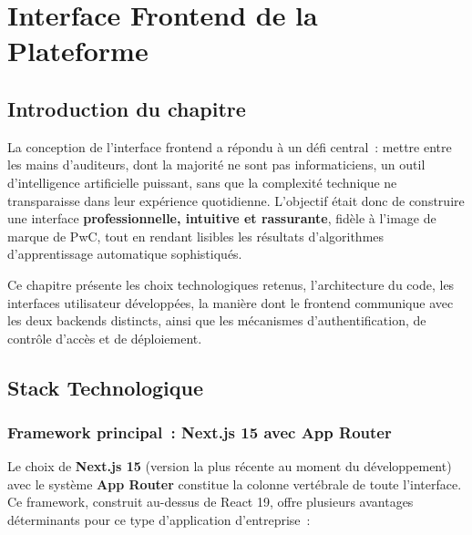 
\chapter{Interface Frontend de la Plateforme}

\section*{Introduction du chapitre}

La conception de l'interface frontend a répondu à un défi central~: mettre entre les mains d'auditeurs, dont la majorité ne sont pas informaticiens, un outil d'intelligence artificielle puissant, sans que la complexité technique ne transparaisse dans leur expérience quotidienne. L'objectif était donc de construire une interface \textbf{professionnelle, intuitive et rassurante}, fidèle à l'image de marque de PwC, tout en rendant lisibles les résultats d'algorithmes d'apprentissage automatique sophistiqués.

Ce chapitre présente les choix technologiques retenus, l'architecture du code, les interfaces utilisateur développées, la manière dont le frontend communique avec les deux backends distincts, ainsi que les mécanismes d'authentification, de contrôle d'accès et de déploiement.

\section{Stack Technologique}

\subsection{Framework principal~: Next.js 15 avec App Router}

Le choix de \textbf{Next.js 15} (version la plus récente au moment du développement) avec le système \textbf{App Router} constitue la colonne vertébrale de toute l'interface. Ce framework, construit au-dessus de React 19, offre plusieurs avantages déterminants pour ce type d'application d'entreprise~:

